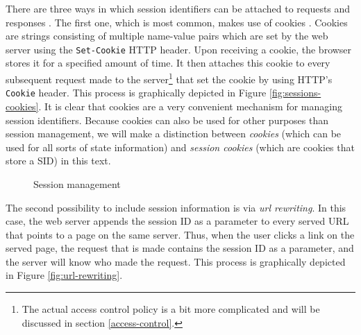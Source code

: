 There are three ways in which session identifiers can be attached to requests and responses \cite{Jovanovic2006}. The first one, which is most common, makes use of \glspl{cookie} \cite{Kristol2001, Park2000}. Cookies are strings consisting of multiple name-value pairs which are set by the web server using the \texttt{Set-Cookie} HTTP header. Upon receiving a cookie, the browser stores it for a specified amount of time. It then attaches this cookie to every subsequent request made to the server\footnote{The actual access control policy is a bit more complicated and will be discussed in section \ref{access-control}.} that set the cookie by using HTTP's \texttt{Cookie} header. This process is graphically depicted in Figure \ref{fig:sessions-cookies}. It is clear that cookies are a very convenient mechanism for managing session identifiers. Because cookies can also be used for other purposes than session management, we will make a distinction between \emph{cookies} (which can be used for all sorts of state information) and \emph{\glspl{session cookie}} (which are cookies that store a SID) in this text.

\begin{figure}[ht]
	\centering
	\caption{Session management}
\end{figure}

The second possibility to include session information is via \emph{\gls{url} rewriting}. In this case, the web server appends the session ID as a parameter to every served URL that points to a page on the same server. Thus, when the user clicks a link on the served page, the request that is made contains the session ID as a parameter, and the server will know who made the request. This process is graphically depicted in Figure \ref{fig:url-rewriting}.

